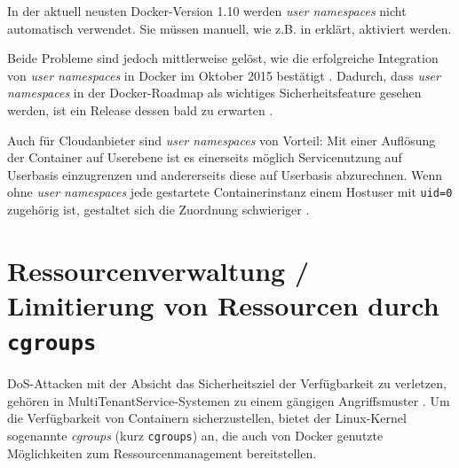 \documentclass[../main.tex]{subfiles}
\begin{document}
			In der aktuell neusten Docker-Version 1.10 werden \emph{user namespaces} nicht automatisch verwendet. Sie müssen manuell, wie z.B. in \cite{nsUserEnable} erklärt, aktiviert werden.


			Beide Probleme sind jedoch mittlerweise gelöst, wie die erfolgreiche Integration von \emph{user namespaces} in Docker im Oktober 2015 bestätigt \cite{githubUserNamespaceIntegration}. Dadurch, dass \emph{user namespaces} in der Docker-Roadmap als wichtiges Sicherheitsfeature gesehen werden, ist ein Release dessen bald zu erwarten \cite{githubDockerRoadmap}.




			Auch für Cloudanbieter sind \emph{user namespaces} von Vorteil: Mit einer Auflösung der Container auf Userebene ist es einerseits möglich Servicenutzung auf Userbasis einzugrenzen und andererseits diese auf Userbasis abzurechnen. Wenn ohne \emph{user namespaces} jede gestartete Containerinstanz einem Hostuser mit \texttt{uid=0} zugehörig ist, gestaltet sich die Zuordnung schwieriger \cite[S.3]{nsUserContainerCon}.
	\section{Ressourcenverwaltung / Limitierung von Ressourcen durch \texttt{\acrshort{cgroups}}}
  \label{secResLimit}
		\acrshort{DoS}-Attacken mit der Absicht das Sicherheitsziel der Verfügbarkeit zu verletzen, gehören in \gls{MultiTenantService}-Systemen zu einem gängigen Angriffsmuster \cite[S.5]{dockerSec1}. Um die Verfügbarkeit von Containern sicherzustellen, bietet der Linux-Kernel sogenannte \emph{\acrlong{cgroups}} (kurz \texttt{\acrshort{cgroups}}) an, die auch von Docker genutzte Möglichkeiten zum Ressourcenmanagement bereitstellen.
\end{document}
